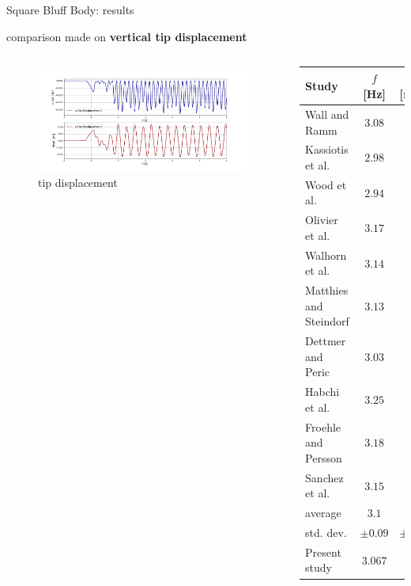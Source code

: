 \documentclass[10pt,t]{beamer}
\begin{document}
\begin{frame}{Square Bluff Body: results}

comparison made on \textbf{vertical tip displacement}

\vspace{0.8cm}

\begin{columns}




\begin{figure}[htbp!]
    \vspace{-1.8cm}
	\centering
	\includegraphics[width=0.98\textwidth, trim=20 20 20 50, clip]{images/sq-cyl/disp_sq.png}
	\caption{tip displacement}
\end{figure}

\scriptsize
		\begin{tabular}{ l | c  c } 
			Study & $f$ [Hz] & $d_{y}$ [mm]   \\ 
			\hline
            Wall and Ramm & $3.08$ & $13.1$ \\
            Kassiotis et al.& $2.98$ & $10.5$ \\
            Wood et al. & $2.94$ & $11.5$ \\
            Olivier et al. & $3.17$ & $9.5$ \\
            Walhorn et al. & $3.14$ & $10.2$ \\
            Matthies and Steindorf  & $3.13$ & $11.8$ \\ 
            Dettmer and Peric & $3.03$ & $12.5$ \\
            Habchi et al. & $3.25$ & $10.2$ \\
            Froehle and Persson  & $3.18$ & $11.2$ \\
            Sanchez et al. & $3.15$ & $11.5$ \\
            \hline
            \cellcolor{green!10}average &\cellcolor{green!10} $3.1$ &\cellcolor{green!10} $11.2$\\
            \cellcolor{green!10}std. dev. &\cellcolor{green!10} $\pm0.09$ &\cellcolor{green!10} $\pm1.06$\\ 
            \hline
            Present study    & $3.067$ & $11.2$ \\
            
		\end{tabular}


\end{columns}

\end{frame}
\end{document}
